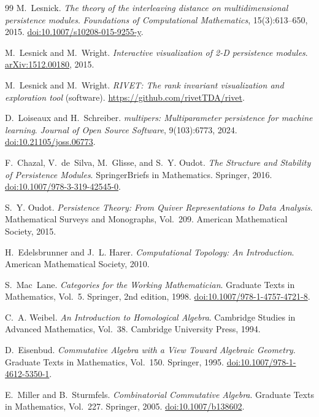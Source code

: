 \documentclass[11pt]{article}
\begin{document}
\begin{thebibliography}{99}
M.~Lesnick.
\newblock \emph{The theory of the interleaving distance on multidimensional persistence modules}.
\newblock \emph{Foundations of Computational Mathematics}, 15(3):613--650, 2015.
\newblock \href{https://doi.org/10.1007/s10208-015-9255-y}{doi:10.1007/s10208-015-9255-y}.

M.~Lesnick and M.~Wright.
\newblock \emph{Interactive visualization of 2-D persistence modules}.
\newblock \href{https://arxiv.org/abs/1512.00180}{arXiv:1512.00180}, 2015.

M.~Lesnick and M.~Wright.
\newblock \emph{RIVET: The rank invariant visualization and exploration tool} (software).
\newblock \url{https://github.com/rivetTDA/rivet}.

D.~Loiseaux and H.~Schreiber.
\newblock \emph{multipers: Multiparameter persistence for machine learning}.
\newblock \emph{Journal of Open Source Software}, 9(103):6773, 2024.
\newblock \href{https://doi.org/10.21105/joss.06773}{doi:10.21105/joss.06773}.

F.~Chazal, V.~de~Silva, M.~Glisse, and S.~Y. Oudot.
\newblock \emph{The Structure and Stability of Persistence Modules}.
\newblock SpringerBriefs in Mathematics. Springer, 2016.
\newblock \href{https://doi.org/10.1007/978-3-319-42545-0}{doi:10.1007/978-3-319-42545-0}.

S.~Y. Oudot.
\newblock \emph{Persistence Theory: From Quiver Representations to Data Analysis}.
\newblock Mathematical Surveys and Monographs, Vol.~209. American Mathematical Society, 2015.

H.~Edelsbrunner and J.~L. Harer.
\newblock \emph{Computational Topology: An Introduction}.
\newblock American Mathematical Society, 2010.

S.~Mac~Lane.
\newblock \emph{Categories for the Working Mathematician}.
\newblock Graduate Texts in Mathematics, Vol.~5. Springer, 2nd edition, 1998.
\newblock \href{https://doi.org/10.1007/978-1-4757-4721-8}{doi:10.1007/978-1-4757-4721-8}.

C.~A. Weibel.
\newblock \emph{An Introduction to Homological Algebra}.
\newblock Cambridge Studies in Advanced Mathematics, Vol.~38. Cambridge University Press, 1994.

D.~Eisenbud.
\newblock \emph{Commutative Algebra with a View Toward Algebraic Geometry}.
\newblock Graduate Texts in Mathematics, Vol.~150. Springer, 1995.
\newblock \href{https://doi.org/10.1007/978-1-4612-5350-1}{doi:10.1007/978-1-4612-5350-1}.

E.~Miller and B.~Sturmfels.
\newblock \emph{Combinatorial Commutative Algebra}.
\newblock Graduate Texts in Mathematics, Vol.~227. Springer, 2005.
\newblock \href{https://doi.org/10.1007/b138602}{doi:10.1007/b138602}.

\end{thebibliography}
\end{document}
